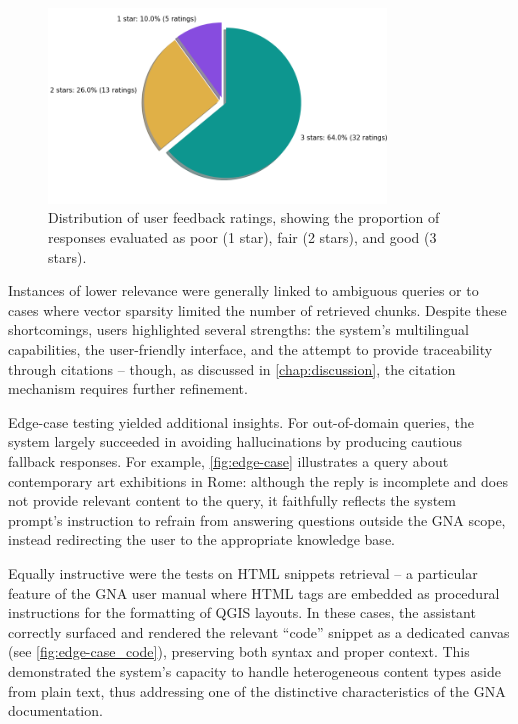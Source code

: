 \begin{spacing}{1.5}
\vspace{0.9em}
\begin{figure}[H]
  \centering
  \includegraphics[width=0.8\textwidth]{images/rating_proportions.png} 
  \caption{Distribution of user feedback ratings, showing the proportion of responses evaluated as poor (1 star), fair (2 stars), and good (3 stars).}
  \label{fig:ratings_}
\end{figure}

Instances of lower relevance were generally linked to ambiguous queries or to cases where vector sparsity limited the number of retrieved chunks. Despite these shortcomings, users highlighted several strengths: the system’s multilingual capabilities, the user-friendly interface, and the attempt to provide traceability through citations -- though, as discussed in \autoref{chap:discussion}, the citation mechanism requires further refinement.

Edge-case testing yielded additional insights. For out-of-domain queries, the system largely succeeded in avoiding hallucinations by producing cautious fallback responses. For example, \autoref{fig:edge-case} illustrates a query about contemporary art exhibitions in Rome: although the reply is incomplete and does not provide relevant content to the query, it faithfully reflects the system prompt’s instruction to refrain from answering questions outside the GNA scope, instead redirecting the user to the appropriate knowledge base.

Equally instructive were the tests on HTML snippets retrieval -- a particular feature of the GNA user manual where HTML tags are embedded as procedural instructions for the formatting of QGIS layouts. In these cases, the assistant correctly surfaced and rendered the relevant ``code'' snippet as a dedicated canvas (see \autoref{fig:edge-case_code}), preserving both syntax and proper context. This demonstrated the system’s capacity to handle heterogeneous content types aside from plain text, thus addressing one of the distinctive characteristics of the GNA documentation.\\


\end{spacing}
